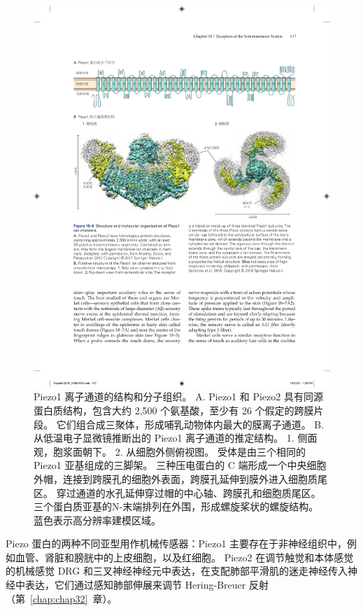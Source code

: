 \begin{figure}[htbp]
	\centering
	\includegraphics[width=1.0\linewidth]{chap18/fig_18_6}
	\caption{Piezo1 离子通道的结构和分子组织。
		A. Piezo1 和 Piezo2 具有同源蛋白质结构，包含大约 2,500 个氨基酸，至少有 26 个假定的跨膜片段。
		它们组合成三聚体，形成哺乳动物体内最大的膜离子通道\cite{murthy2017piezos}。
		B. 从低温电子显微镜推断出的 Piezo1 离子通道的推定结构。
		1. 侧面观，胞浆面朝下。
		2. 从细胞外侧俯视图。
		受体是由三个相同的 Piezo1 亚基组成的三脚架。
		三种压电蛋白的 C 端形成一个中央细胞外帽，连接到跨膜孔的细胞外表面，跨膜孔延伸到膜外进入细胞质尾区。
		穿过通道的水孔延伸穿过帽的中心轴、跨膜孔和细胞质尾区。
		三个蛋白质亚基的N-末端排列在外围，形成螺旋桨状的螺旋结构。 
		蓝色表示高分辨率建模区域\cite{saotome2018structure}。}
	\label{fig:18_6}
\end{figure}



Piezo 蛋白的两种不同亚型用作机械传感器：Piezo1 主要存在于非神经组织中，例如血管、肾脏和膀胱中的上皮细胞，以及红细胞。 
Piezo2 在调节触觉和本体感觉的机械感觉 DRG 和三叉神经神经元中表达，在支配肺部平滑肌的迷走神经传入神经中表达，它们通过感知肺部伸展来调节 Hering-Breuer 反射（第~\ref{chap:chap32}~章）。



